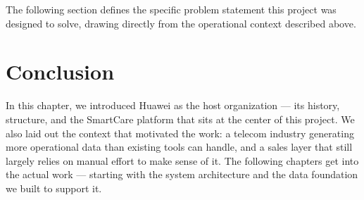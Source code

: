 \bigskip
\noindent The following section defines the specific problem statement this project 
was designed to solve, drawing directly from the operational context described above.
\section{Conclusion}
In this chapter, we introduced Huawei as the host organization --- its history, structure, and the SmartCare platform that sits at the center of this project. We also laid out the context that motivated the work: a telecom industry generating more operational data than existing tools can handle, and a sales layer that still largely relies on manual effort to make sense of it. The following chapters get into the actual work --- starting with the system architecture and the data foundation we built to support it.
